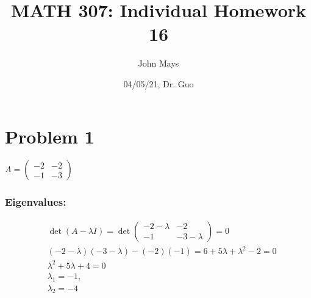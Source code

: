 \documentclass[fleqn]{article}
\title{\textbf{MATH 307: Individual Homework 16}}
\author{John Mays}
\date{04/05/21, Dr. Guo}
\begin{document}
\maketitle


\section*{Problem 1}
$A=\begin{pmatrix}-2&-2\\-1&-3\end{pmatrix}$
\subsubsection*{Eigenvalues: }
\begin{equation*}
    \begin{split}
    &\det (A-\lambda I) = \det \begin{pmatrix}-2-\lambda&-2\\-1&-3-\lambda\end{pmatrix}= 0\\
    &(-2-\lambda)(-3-\lambda)-(-2)(-1) = 6+5\lambda+\lambda^2-2=0\\
    &\lambda^2+5\lambda+4=0\\
    &\lambda_1 = -1,\\
    &\lambda_2 = -4
    \end{split}
\end{equation*}
\end{document}
